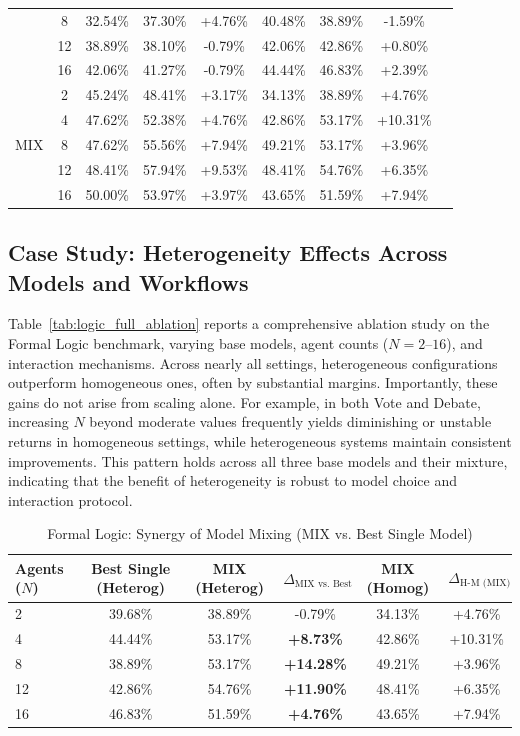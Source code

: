 \documentclass{article}
\theoremstyle{plain}
\theoremstyle{definition}
\theoremstyle{remark}
\begin{document}
\begin{table}[t]
\begin{tabular}{lcccccccc}
 & 8  & 32.54\% & 37.30\% & +4.76\% & 40.48\% & 38.89\% & -1.59\% \\
 & 12 & 38.89\% & 38.10\% & -0.79\% & 42.06\% & 42.86\% & +0.80\% \\
 & 16 & 42.06\% & 41.27\% & -0.79\% & 44.44\% & 46.83\% & +2.39\% \\
 \midrule
 \multirow{5}{*}{MIX} 
 & 2  & 45.24\% & 48.41\% & +3.17\% & 34.13\% & 38.89\% & +4.76\% \\
 & 4  & 47.62\% & 52.38\% & +4.76\% & 42.86\% & 53.17\% & +10.31\% \\
 & 8  & 47.62\% & 55.56\% & +7.94\% & 49.21\% & 53.17\% & +3.96\% \\
 & 12 & 48.41\% & 57.94\% & +9.53\% & 48.41\% & 54.76\% & +6.35\% \\
 & 16 & 50.00\% & 53.97\% & +3.97\% & 43.65\% & 51.59\% & +7.94\% \\
\bottomrule
\end{tabular}
\end{table}


\subsection{Case Study: Heterogeneity Effects Across Models and Workflows}

Table~\ref{tab:logic_full_ablation} reports a comprehensive ablation study on the
Formal Logic benchmark, varying base models, agent counts ($N=2$--$16$), and
interaction mechanisms.
Across nearly all settings, heterogeneous configurations outperform homogeneous
ones, often by substantial margins.
Importantly, these gains do not arise from scaling alone.
For example, in both Vote and Debate, increasing $N$ beyond moderate values
frequently yields diminishing or unstable returns in homogeneous settings,
while heterogeneous systems maintain consistent improvements.
This pattern holds across all three base models and their mixture, indicating that
the benefit of heterogeneity is robust to model choice and interaction protocol.

\begin{table}[h]
\centering
\caption{Formal Logic: Synergy of Model Mixing (MIX vs. Best Single Model)}
\label{tab:logic_mix_synergy}
\small
\begin{tabular}{lccccc}
\toprule
\textbf{Agents ($N$)} & \textbf{Best Single (Heterog)} & \textbf{MIX (Heterog)} & \textbf{$\Delta_{\text{MIX vs. Best}}$} & \textbf{MIX (Homog)} & \textbf{$\Delta_{\text{H-M (MIX)}}$} \\
\midrule
2  & 39.68\%  & 38.89\% & -0.79\% & 34.13\% & +4.76\% \\
4  & 44.44\%  & 53.17\% & \textbf{+8.73\%} & 42.86\% & +10.31\% \\
8  & 38.89\%  & 53.17\% & \textbf{+14.28\%} & 49.21\% & +3.96\% \\
12 & 42.86\%  & 54.76\% & \textbf{+11.90\%} & 48.41\% & +6.35\% \\
16 & 46.83\%  & 51.59\% & \textbf{+4.76\%} & 43.65\% & +7.94\% \\
\bottomrule
\end{tabular}
\end{table}
\end{document}
